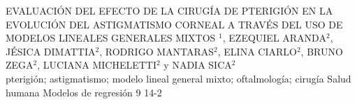 \A
{EVALUACIÓN DEL EFECTO DE LA CIRUGÍA DE PTERIGIÓN EN LA EVOLUCIÓN DEL ASTIGMATISMO CORNEAL A TRAVÉS DEL USO DE MODELOS LINEALES GENERALES MIXTOS}
{$^1$, EZEQUIEL ARANDA$^2$, JÉSICA DIMATTIA$^2$, RODRIGO MANTARAS$^2$, ELINA CIARLO$^2$, BRUNO ZEGA$^2$, LUCIANA MICHELETTI$^2$ y NADIA SICA$^2$}
{
\\}
{pterigión; astigmatismo; modelo lineal general mixto; oftalmología; cirugía} 
 {Salud humana} 
 {Modelos de regresión} 
 {9} 
 {14-2}
